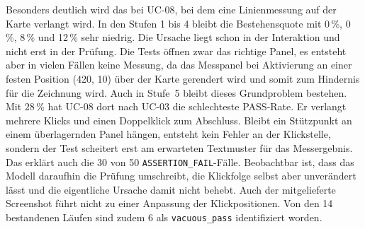 Besonders deutlich wird das bei UC-08, bei dem eine Linienmessung auf der Karte verlangt wird. In den Stufen 1 bis 4 bleibt die Bestehensquote mit 0\,\%, 0\,\%, 8\,\% und 12\,\% sehr niedrig. Die Ursache liegt schon in der Interaktion und nicht erst in der Prüfung. Die Tests öffnen zwar das richtige Panel, es entsteht aber in vielen Fällen keine Messung, da das Messpanel bei Aktivierung an einer festen Position (420, 10) über der Karte gerendert wird und somit zum Hindernis für die Zeichnung wird. Auch in Stufe~5 bleibt dieses Grundproblem bestehen. Mit 28\,\% hat UC-08 dort nach UC-03 die schlechteste PASS-Rate. Er verlangt mehrere Klicks und einen Doppelklick zum Abschluss. Bleibt ein Stützpunkt an einem überlagernden Panel hängen, entsteht kein Fehler an der Klickstelle, sondern der Test scheitert erst am erwarteten Textmuster für das Messergebnis. Das erklärt auch die 30 von 50 \texttt{ASSERTION\_FAIL}-Fälle. Beobachtbar ist, dass das Modell daraufhin die Prüfung umschreibt, die Klickfolge selbst aber unverändert lässt und die eigentliche Ursache damit nicht behebt. Auch der mitgelieferte Screenshot führt nicht zu einer Anpassung der Klickpositionen. Von den 14 bestandenen Läufen sind zudem 6 als \texttt{vacuous\_pass} identifiziert worden.